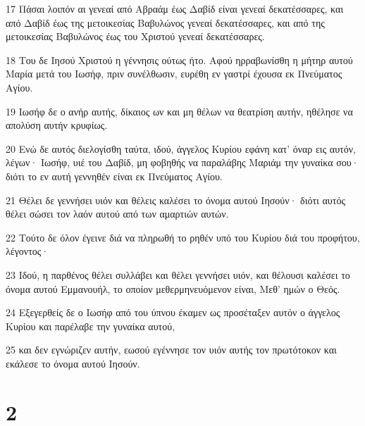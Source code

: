 \par 17 Πάσαι λοιπόν αι γενεαί από Αβραάμ έως Δαβίδ είναι γενεαί δεκατέσσαρες, και από Δαβίδ έως της μετοικεσίας Βαβυλώνος γενεαί δεκατέσσαρες, και από της μετοικεσίας Βαβυλώνος έως του Χριστού γενεαί δεκατέσσαρες.
\par 18 Του δε Ιησού Χριστού η γέννησις ούτως ήτο. Αφού ηρραβωνίσθη η μήτηρ αυτού Μαρία μετά του Ιωσήφ, πριν συνέλθωσιν, ευρέθη εν γαστρί έχουσα εκ Πνεύματος Αγίου.
\par 19 Ιωσήφ δε ο ανήρ αυτής, δίκαιος ων και μη θέλων να θεατρίση αυτήν, ηθέλησε να απολύση αυτήν κρυφίως.
\par 20 Ενώ δε αυτός διελογίσθη ταύτα, ιδού, άγγελος Κυρίου εφάνη κατ' όναρ εις αυτόν, λέγων· Ιωσήφ, υιέ του Δαβίδ, μη φοβηθής να παραλάβης Μαριάμ την γυναίκα σου· διότι το εν αυτή γεννηθέν είναι εκ Πνεύματος Αγίου.
\par 21 Θέλει δε γεννήσει υιόν και θέλεις καλέσει το όνομα αυτού Ιησούν· διότι αυτός θέλει σώσει τον λαόν αυτού από των αμαρτιών αυτών.
\par 22 Τούτο δε όλον έγεινε διά να πληρωθή το ρηθέν υπό του Κυρίου διά του προφήτου, λέγοντος·
\par 23 Ιδού, η παρθένος θέλει συλλάβει και θέλει γεννήσει υιόν, και θέλουσι καλέσει το όνομα αυτού Εμμανουήλ, το οποίον μεθερμηνευόμενον είναι, Μεθ' ημών ο Θεός.
\par 24 Εξεγερθείς δε ο Ιωσήφ από του ύπνου έκαμεν ως προσέταξεν αυτόν ο άγγελος Κυρίου και παρέλαβε την γυναίκα αυτού,
\par 25 και δεν εγνώριζεν αυτήν, εωσού εγέννησε τον υιόν αυτής τον πρωτότοκον και εκάλεσε το όνομα αυτού Ιησούν.

\chapter{2}

